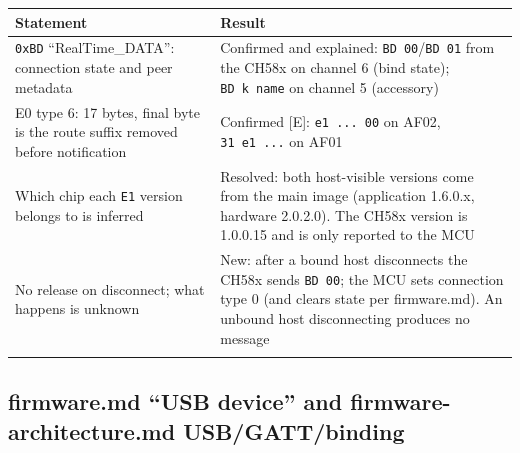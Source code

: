{\def\LTcaptype{none} %
\begin{longtable}[]{@{}
  >{\raggedright\arraybackslash}p{}
  >{\raggedright\arraybackslash}p{}@{}}
\toprule\noalign{}
\begin{minipage}[b]{\linewidth}\raggedright
Statement
\end{minipage} & \begin{minipage}[b]{\linewidth}\raggedright
Result
\end{minipage} \\
\midrule\noalign{}
\endhead
\bottomrule\noalign{}
\endlastfoot
\texttt{0xBD} ``RealTime\_DATA'': connection state and peer metadata &
Confirmed and explained: \texttt{BD\ 00}/\texttt{BD\ 01} from the CH58x
on channel 6 (bind state); \texttt{BD\ k\ name} on channel 5
(accessory) \\
E0 type 6: 17 bytes, final byte is the route suffix removed before
notification & Confirmed {[}E{]}: \texttt{e1\ ...\ 00} on AF02,
\texttt{31\ e1\ ...} on AF01 \\
Which chip each \texttt{E1} version belongs to is inferred & Resolved:
both host-visible versions come from the main image (application
1.6.0.x, hardware 2.0.2.0). The CH58x version is 1.0.0.15 and is only
reported to the MCU \\
No release on disconnect; what happens is unknown & New: after a bound
host disconnects the CH58x sends \texttt{BD\ 00}; the MCU sets
connection type 0 (and clears state per firmware.md). An unbound host
disconnecting produces no message \\*
\end{longtable}
}

\subsection{firmware.md ``USB device'' and firmware-architecture.md
USB/GATT/binding}\label{firmware.md-usb-device-and-firmware-architecture.md-usbgattbinding}


